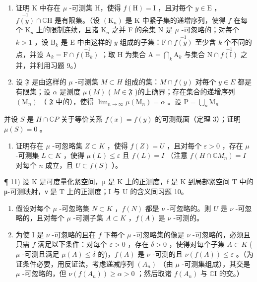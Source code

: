 \begin{enumerate}
\def\labelenumi{\alph{enumi})}
\item
  证明 K 中存在 \(\mu\) -可测集 H，使得 \(f(\mathrm{H}) = \mathrm{I}\) ，且对每个 \(y \in \mathrm{E}\) ，\(\stackrel{-1}{f(y)} \cap \mathbb{C}\mathrm{H}\) 是有限集。（设 \((\mathrm{K}_n)\) 是 K 中紧子集的递增序列，使得 \(f\) 在每个 \(\mathrm{K}_n\) 上的限制连续，且诸 \(\mathrm{K}_n\) 之并 F 的余集 N 是 \(\mu\) -可忽略的；对每个 \(k > 1\) ，设 \(\mathrm{B}_k\) 是 E 中由这样的 \(y\) 组成的子集：\(\mathrm{F} \cap \stackrel{-1}{f(y)}\) 至少含 \(k\) 个不同的点，并设 \(\mathrm{A}_k = \mathrm{F} \cap \stackrel{-1}{f(\mathrm{B}_k)}\) ；取 H 为集合 \(\mathrm{A} = \bigcap_k \mathrm{A}_k\) 与集合 \(\mathrm{N} \cap \stackrel{-1}{f(\mathrm{I})}\) 之并，并利用习题 9。）
\item
  设 \(\mathfrak{F}\) 是由这样的 \(\mu\) -可测集 \(M \subset H\) 组成的集：\(M \cap f(y)\) 对每个 \(y \in E\) 都是有限集；设 \(\alpha\) 是测度 \(\mu(M)\) ( \(M \in \mathfrak{F}\) )的上确界；存在集合的递增序列 \((\mathrm{M}_n)\) （ \(\mathfrak{F}\) 中的），使得 \(\lim_{n\to \infty}\mu (\mathrm{M}_n) = \alpha\) 。设 \(\mathrm{P} = \bigcup_{n}\mathrm{M}_{n}\)
\end{enumerate}

并设 \(S\) 是 \(H \cap \mathbb{C}P\) 关于等价关系 \(f(x) = f(y)\) 的可测截面（定理 3）；证明 \(\mu(S) = 0\) 。

\begin{enumerate}
\def\labelenumi{\alph{enumi})}
\setcounter{enumi}{2}
\tightlist
\item
  证明存在 \(\mu\) -可忽略集 \(Z \subset K\) ，使得 \(f(Z) = U\) ，且对每个 \(\varepsilon > 0\) ，存在 \(\mu\) -可测集 \(L \subset K\) ，使得 \(\mu(L) \leqslant \varepsilon\) 且 \(f(L) = I\) （注意 \(f(H \cap \mathbb{C}M_n) = I\) 对每个 \(n\) 成立，且 \(U \subset f(S)\) ）。
\end{enumerate}

¶ 11) 设 K 是可度量化紧空间，μ 是 K 上的正测度，f 是 K 到局部紧空间 T 中的 μ-可测映射，ν 是 T 上的正测度；I 与 U 的含义同习题 10。

\begin{enumerate}
\def\labelenumi{\alph{enumi})}
\item
  假设对每个 \(\mu\) -可忽略集 \(N \subset K\) ，\(f(N)\) 都是 \(\nu\) -可忽略的。则 \(U\) 是 \(\nu\) -可忽略的，且对每个 \(\mu\) -可测子集 \(A \subset K\) ，\(f(A)\) 是 \(\nu\) -可测的。
\item
  为使 I 是 \(\nu\) -可忽略的且在 \(f\) 下每个 \(\mu\) -可忽略集的像是 \(\nu\) -可忽略的，必须且只需 \(f\) 满足以下条件：对每个 \(\varepsilon > 0\) ，存在 \(\delta > 0\) ，使得对每个子集 \(A \subset K\) ( \(\mu\) -可测且满足 \(\mu(A) \leqslant \delta\) 的)，\(f(A)\) 是 \(\nu\) -可测的且 \(\nu(f(A)) \leqslant \varepsilon\) 。（为证条件必要，用反证法，考虑递减序列 \((A_n)\) （由 \(\mu\) -可测集组成），其交是 \(\mu\) -可忽略的，但 \(\nu(f(A_n)) \geqslant \alpha > 0\) ；然后取诸 \(f(A_n)\) 与 \(\mathbb{C}\mathrm{I}\) 的交。）
\end{enumerate}

